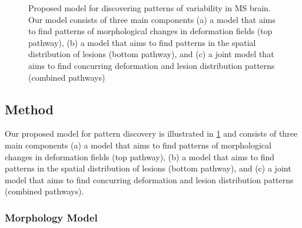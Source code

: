 \begin{figure}[tb]
\centering

\caption[Proposed model for discovering patterns of variability in MS
brain]{Proposed model for discovering patterns of variability in MS brain.
Our model consists of three main components (a) a model that aims to find
patterns of morphological changes in deformation fields (top pathway), (b) a
model that aims to find patterns in the spatial distribution of lesions (bottom
pathway), and (c) a joint model that aims to find concurring deformation and
lesion distribution patterns (combined pathways)}
\label{fig:msdbnmodel}
\end{figure}

\subsection{Method}

Our proposed model for pattern discovery is illustrated in \ref{fig:msdbnmodel}
and consists of three main components (a) a model that aims to find patterns of
morphological changes in deformation fields (top pathway), (b) a model that aims
to find patterns in the spatial distribution of lesions (bottom pathway), and
(c) a joint model that aims to find concurring deformation and lesion
distribution patterns (combined pathways).

\subsubsection{Morphology Model}

